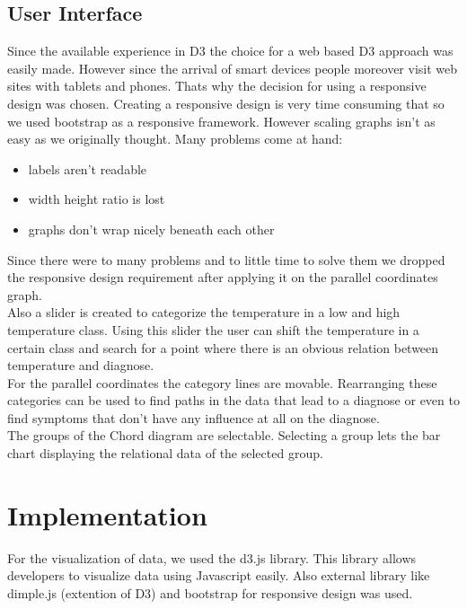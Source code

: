 \documentclass[a4paper,twoside,11pt]{article}
\begin{document}
\newpage

\subsection{User Interface}
Since the available experience in D3 the choice for a web based D3 approach was easily made. However since the arrival of smart devices people moreover visit web sites with tablets and phones. Thats why the decision for using a responsive design was chosen. Creating a responsive design is very time consuming that so we used bootstrap as a responsive framework. However scaling graphs isn't as easy as we originally thought. Many problems come at hand:
\begin{itemize}
  \item labels aren't readable \\
  \item width height ratio is lost \\
  \item graphs don't wrap nicely beneath each other \\
\end{itemize}
Since there were to many problems and to little time to solve them we dropped the responsive design requirement after applying it on the parallel coordinates graph. \\

Also a slider is created to categorize the temperature in a low and high temperature class. Using this slider the user can shift the temperature in a certain class and search for a point where there is an obvious relation between temperature and diagnose. \\

For the parallel coordinates the category lines are movable. Rearranging these categories can be used to find paths in the data that lead to a diagnose or even to find symptoms that don't have any influence at all on the diagnose. \\

The groups of the Chord diagram are selectable. Selecting a group lets the bar chart displaying the relational data of the selected group. \\
\newpage

\section{Implementation}
For the visualization of data, we used the d3.js library. This library allows developers to visualize data using Javascript easily. Also external library like dimple.js (extention of D3) and bootstrap for responsive design was used.
\end{document}

